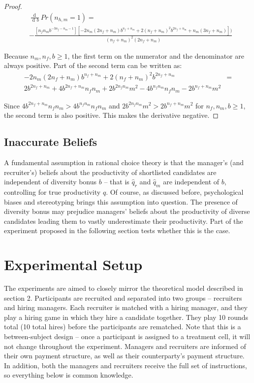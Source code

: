 \documentclass[11pt]{article}
\DeclareMathOperator{\di}{d\!}
\begin{document}
\begin{proof}
    \begin{align*}
         & \frac{\di}{\di b} Pr(n_{h,m}=1) =                                                                                                         \\
         & -\frac{[n_f n_m b^{-3 n_f-n_m-1}] [-2 n_m (2 n_f+n_m) b^{n_f+n_m}+2 (n_f+n_m)^2 b^{2 n_f+n_m}+n_m (3 n_f+n_m)])}{(n_f+n_m)^2 (2 n_f+n_m)}
    \end{align*}

    Because $n_m, n_f, b \geq 1$, the first term on the numerator and the denominator are always positive. Part of the second term can be written as:
    \begin{align*}
        -2 n_m (2 n_f+n_m) b^{n_f+n_m}+2 (n_f+n_m)^2 b^{2 n_f+n_m} & = \\
        2b^{2n_f+n_m} + 4b^{2n_f+n_m} n_f n_m + 2b^{2n_fn_m} m^2 - 4b^{n_fn_m}n_fn_m - 2b^{n_f+n_m}m^2
    \end{align*}

    Since $4b^{2n_f+n_m} n_f n_m > 4b^{n_fn_m}n_fn_m$ and $2b^{2n_fn_m} m^2 > 2b^{n_f+n_m}m^2$ for $n_f,n_m,b \geq 1$, the second term is also positive. This makes the derivative negative.
\end{proof}

\subsection{Inaccurate Beliefs}

A fundamental assumption in rational choice theory is that the manager's (and recruiter's) beliefs about the productivity of shortlisted candidates are independent of diversity bonus $b$ -- that is $\hat{q}_r$ and $\hat{q}_m$ are independent of $b$, controlling for true productivity $q$. Of course, as discussed before, psychological biases and stereotyping brings this assumption into question. The presence of diversity bonus may prejudice managers' beliefs about the productivity of diverse candidates leading them to vastly underestimate their productivity.  Part of the experiment proposed in the following section tests whether this is the case.

\section{Experimental Setup}

The experiments are aimed to closely mirror the theoretical model described in section 2. Participants are recruited and separated into two groups -- recruiters and hiring managers. Each recruiter is matched with a hiring manager, and they play a hiring game in which they hire a candidate together. They play 10 rounds total (10 total hires) before the participants are rematched.  Note that this is a between-subject design -- once a participant is assigned to a treatment cell, it will not change throughout the experiment. Managers and recruiters are informed of their own payment structure, as well as their counterparty's payment structure. In addition, both the managers and recruiters receive the full set of instructions, so everything below is common knowledge.
\\
\end{document}
